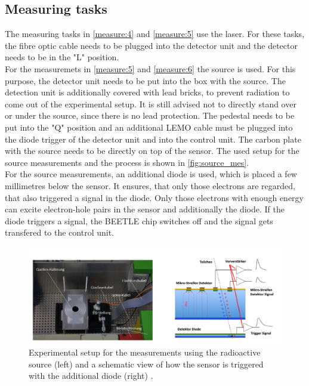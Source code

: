\subsection{Measuring tasks}

The measuring tasks in \ref{measure:4} and \ref{measure:5} use the laser. For these tasks, the fibre optic cable
needs to be plugged into the detector unit and the detector needs to be in the "L" position.\\
For the measuremets in \ref{measure:5} and \ref{measure:6} the source is used. For this purpose, the detector unit needs
to be put into the box with the source. The detection unit is additionally covered with lead bricks, to prevent radiation to come 
out of the experimental setup. It is still advised not to directly stand over or under the source, since there is no 
lead protection. The pedestal needs to be put into the "Q" position and an additional LEMO cable must be plugged into
the diode trigger of the detector unit and into the control unit. The carbon plate with the source needs to be directly on top
of the sensor. The used setup for the source measurements and the process is shown in \autoref{fig:source_mes}. \\
For the 
source measurements, an additional diode is used, which is placed a few millimetres below the sensor. It ensures, that only
those electrons are regarded, that also triggered a signal in the diode. Only those electrons with enough energy can excite
electron-hole pairs in the sensor and additionally the diode. If the diode triggers a signal, the BEETLE chip switches off
and the signal gets transfered to the control unit.
\begin{figure}
    \centering
    \includegraphics[width = .8\textwidth]{content/pics/Silicon_Sensor_SOURCE.png}
    \caption{Experimental setup for the measurements using the radioactive source (left) and a schematic view of how the sensor
    is triggered with the additional diode (right) \cite{SiliconStrip}.}
    \label{fig:source_mes}
\end{figure}\\

